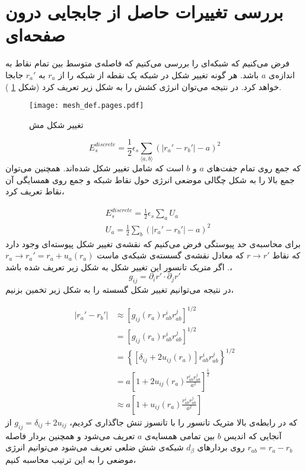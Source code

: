 \section{بررسی تغییرات حاصل از جابجایی درون صفحه‌ای}

فرض می‌کنیم که شبکه‌ای را بررسی می‌کنیم که فاصله‌ی متوسط بین تمام نقاط به اندازه‌ی $a$ باشد. هر گونه تغییر شکل در شبکه یک نقطه از شبکه را از $r_a$ به $r_a'$ جابجا خواهد کرد. در نتیجه می‌توان انرژی کشش را به شکل زیر تعریف کرد (شکل
\ref{fig:mesh_def}
).
\begin{figure}[h]
\begin{center}
\texttt{[image: mesh\_def.pages.pdf]}
\caption{
تغییر شکل مش
}
\label{fig:mesh_def}
\end{center}
\end{figure}

\begin{equation}
E_s^{discrete}=\frac{1}{2}\epsilon_s\sum_{\langle a,b\rangle}\left(|r_a'-r_b'|-a\right)^2
\end{equation}
که جمع روی تمام جفت‌های $a$ و $b$ است که شامل تغییر شکل شده‌اند.  همچنین می‌توان جمع بالا را به شکل چگالی موضعی انرژی حول نقاط شبکه و جمع روی همسایگی‌ آن نقاط تعریف کرد،

\begin{equation}
\begin{aligned}
&E_s^{discrete}=\frac{1}{2}\epsilon_s\sum_aU_a\\
&U_a=\frac{1}{2}\sum_b\left(|r_a'-r_b'|-a\right)^2
\end{aligned}
\end{equation}
برای محاسبه‌ی حد پیوستگی فرض می‌کنیم که نقشه‌‌ی تغییر شکل پیوسته‌ای وجود دارد که نقاط 
$r\rightarrow r'$
که معادل نقشه‌ی گسسته‌ی شبکه‌ی ماست
$r_a\rightarrow r_a'=r_a+u_a(r_a)$
. اگر متریک تانسور این تغییر شکل به شکل زیر تعریف شده باشد،
\begin{equation}
g_{ij}=\partial_i r'\cdot\partial_jr'
\end{equation}
در نتیجه می‌توانیم تغییر شکل گسسته را به شکل زیر تخمین بزنیم،

\begin{equation}
\begin{aligned}
|r_a'-r_b'|&\approx \left[g_{ij}(r_a)r_{ab}^ir_{ab}^j\right]^{1/2}\\
&= \left[g_{ij}(r_a)r_{ab}^ir_{ab}^j\right]^{1/2}\\
&= \left\{\left[\delta_{ij}+2u_{ij}(r_a)\right]r_{ab}^ir_{ab}^j\right\}^{1/2}\\
&= a\left[1+2u_{ij}(r_a)\frac{r_{ab}^ir_{ab}^j}{a^2}\right]^\frac{1}{2}\\
&\approx a\left[1+u_{ij}(r_a)\frac{r_{ab}^ir_{ab}^j}{a^2}\right]
\label{eq:gstrain1}
\end{aligned}
\end{equation}
که در رابطه‌ی بالا متریک تانسور را با تانسوز تنش جاگذاری کردیم،
$g_{ij}=\delta_{ij}+2u_{ij}$
از آنجایی که اندیس $b$ بین تمامی همسایه‌ی $a$ تعریف می‌شود و همچنین بردار فاصله‌
$r_{ab}=r_a-r_b$
روی بردار‌های
$d_\beta$
 شبکه‌ی شش ضلعی تعریف می‌شود می‌توانیم انرژی موضعی را به این ترتیب محاسبه‌ کنیم،

